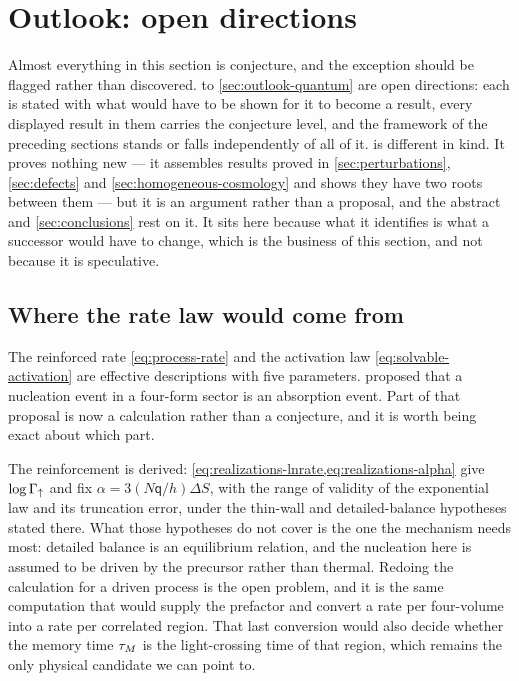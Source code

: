 \section{Outlook: open directions}\label{sec:outlook}

Almost everything in this section is conjecture, and the exception should be
flagged rather than discovered.  to
\cref{sec:outlook-quantum} are open directions: each is stated with what would
have to be shown for it to become a result, every displayed result in them
carries the conjecture level, and the framework of the preceding sections
stands or falls independently of all of it.
 is different in kind. It proves nothing new
--- it assembles results proved in \cref{sec:perturbations},
\cref{sec:defects} and \cref{sec:homogeneous-cosmology} and shows they have
two roots between them --- but it is an argument rather than a proposal, and
the abstract and \cref{sec:conclusions} rest on it. It sits here because what
it identifies is what a successor would have to change, which is the business
of this section, and not because it is speculative.

\subsection{Where the rate law would come from}\label{sec:outlook-rate}

The reinforced rate \cref{eq:process-rate} and the activation law
\cref{eq:solvable-activation} are effective descriptions with five parameters.
 proposed that a nucleation event in a four-form
sector is an absorption event. Part of that proposal is now a calculation
rather than a conjecture, and it is worth being exact about which part.

The reinforcement is derived: \cref{eq:realizations-lnrate,eq:realizations-alpha}
give $\log\Gamma_\uparrow$ and fix $\alpha=3(N\mathsf q/h)\Delta S$, with the
range of validity of the exponential law and its truncation error, under the
thin-wall and detailed-balance hypotheses stated there. What those hypotheses
do not cover is the one the mechanism needs most: detailed balance is an
equilibrium relation, and the nucleation here is assumed to be driven by the
precursor rather than thermal. Redoing the calculation for a driven process is
the open problem, and it is the same computation that would supply the
prefactor and convert a rate per four-volume into a rate per correlated region.
That last conversion would also decide whether the memory time $\tau_{M}$ is the
light-crossing time of that region, which remains the only physical candidate
we can point to.

